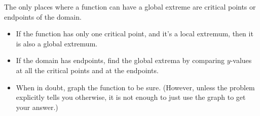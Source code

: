 \begin{theorem}
The only places where a function can have a global extreme are critical points or endpoints of the domain.
    \begin{itemize}
    \item If the function has only one critical point, and it's a local extremum, then it is also a global extremum.
    \item If the domain has endpoints, find the global extrema by comparing $y$-values at all the critical points and at the endpoints.
    \item When in doubt, graph the function to be sure. (However, unless the problem explicitly tells you otherwise, it is not enough to just use the graph to get your answer.)
    \end{itemize}
\end{theorem}
